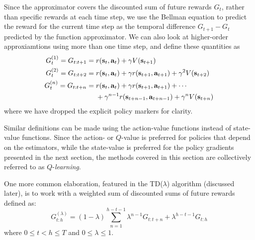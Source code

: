 \documentclass{article}
\begin{document}
Since the approximator covers the discounted sum of future rewards $G_t$, rather than specific rewards at each time step, we use the Bellman equation to predict the reward for the current time step as the temporal difference $G_{t+1}-G_t$ predicted by the function approximator. We can also look at higher-order approxiamtions using more than one time step, and define these quantities as \begin{equation}\begin{split}
G_t^{(1)}=G_{t:t+1}&=r(\mathbf{s}_t,\mathbf{a}_t)+\gamma V (\mathbf{s}_{t+1})\\G_t^{(2)}=G_{t:t+2}&=r(\mathbf{s}_t,\mathbf{a}_t)+\gamma r(\mathbf{s}_{t+1},\mathbf{a}_{t+1})+\gamma^2 V (\mathbf{s}_{t+2})\\G_t^{(n)}=G_{t:t+n}&=r(\mathbf{s}_t,\mathbf{a}_t)+\gamma r(\mathbf{s}_{t+1},\mathbf{a}_{t+1})+\cdots\\&\nobreakspace\nobreakspace\nobreakspace\nobreakspace+\gamma^{n-1}r(\mathbf{s}_{t+n-1},\mathbf{a}_{t+n-1})+\gamma^n V (\mathbf{s}_{t+n})\\\end{split}\end{equation} where we have dropped the explicit policy markers for clarity. 

Similar definitions can be made using the action-value functions instead of state-value functions. Since the action- or $Q$-value is preferred for policies that depend on the estimators, while the state-value is preferred for the policy gradients presented in the next section, the methods covered in this section are collectively referred to as $Q$-\textit{learning}.

One more common elaboration, featured in the TD($\lambda$) algorithm (discussed later), is to work with a weighted sum of discounted sums of future rewards defined as:
\begin{equation}
G_{t:h}^{(\lambda)} =(1-\lambda)\sum_{n=1}^{h-t-1}\lambda^{n-1}G_{t:t+n}+\lambda^{h-t-1}G_{t:h} 
\end{equation} where $0\leq t<h\leq T$ and $0\leq \lambda \leq 1$.
\end{document}
